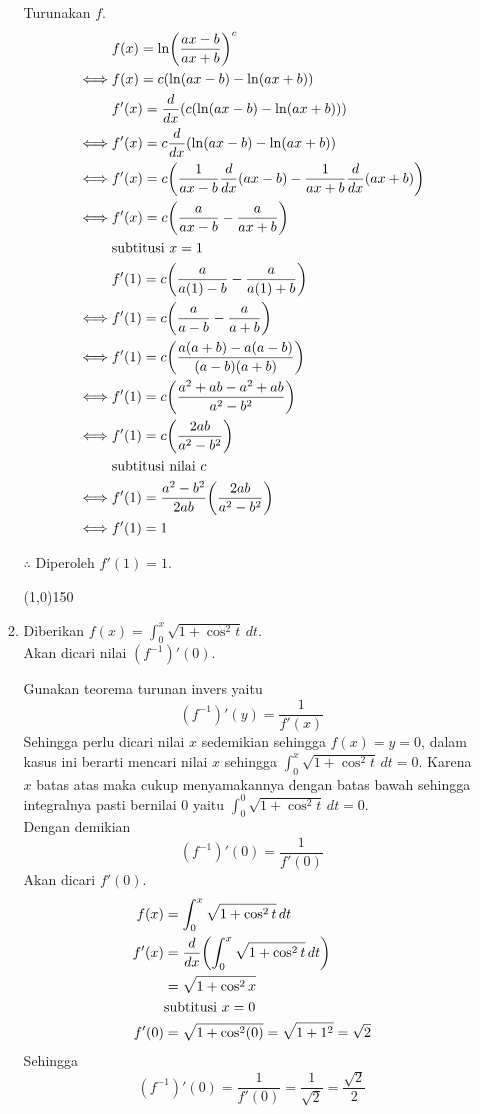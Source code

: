 \begin{enumerate}[leftmargin=*, label={\arabic*}.]
\begin{enumerate}[label={\alph*}.]
    Turunakan $f$.
    \begin{align*}
        &f(x) = \ln\brk*{\frac{ax-b}{ax+b}}^{c}\\
        \iff &f(x) = c\brk*{\ln(ax-b)-\ln(ax+b)}\\
        &f'(x) = \drv{x}{c\brk*{\ln(ax-b)-\ln(ax+b)}}\\
        \iff &f'(x) = c\drv{x}{\ln(ax-b)-\ln(ax+b)}\\
        \iff &f'(x) = c\brk*{\frac{1}{ax-b}\drv{x}{ax-b}
        -\frac{1}{ax+b}\drv{x}{ax+b}}\\
        \iff &f'(x) = c\brk*{\frac{a}{ax-b}
        -\frac{a}{ax+b}}\\
        &\text{subtitusi $x=1$}\\
        &f'(1) = c\brk*{\frac{a}{a(1)-b}-\frac{a}{a(1)+b}}\\
        \iff &f'(1) = c\brk*{\frac{a}{a-b}-\frac{a}{a+b}}\\
        \iff &f'(1) = c\brk*{\frac{a(a+b)-a(a-b)}{(a-b)(a+b)}}\\
        \iff &f'(1) = c\brk*{\frac{a^{2}+ab-a^{2}+ab}{a^{2}-b^{2}}}\\
        \iff &f'(1) = c\brk*{\frac{2ab}{a^{2}-b^{2}}}\\
        &\text{subtitusi nilai $c$}\\
        \iff &f'(1) = \frac{a^{2}-b^{2}}{2ab}\brk*{\frac{2ab}{a^{2}-b^{2}}}\\
        \iff &f'(1) = 1
    \end{align*}

    $\therefore$ Diperoleh $f'(1)=1$.


\begin{center}\line(1,0){150}\end{center}


    \item Diberikan $f(x)=\int_0^{x}\sqrt{1+\cos^{2}t}\,dt$.\\
    Akan dicari nilai $(f^{-1})'(0)$.

    Gunakan teorema turunan invers yaitu
    \[
    (f^{-1})'(y) = \frac{1}{f'(x)}
    \]
    Sehingga perlu dicari nilai $x$ sedemikian sehingga $f(x)=y=0$, dalam kasus 
    ini berarti mencari nilai $x$ sehingga $\int_0^{x}\sqrt{1+\cos^{2}t}\,dt = 0$. 
    Karena $x$ batas atas maka cukup menyamakannya dengan batas bawah sehingga 
    integralnya pasti bernilai $0$ yaitu $\int_0^{0}\sqrt{1+\cos^{2}t}\,dt = 0$.\\
    Dengan demikian
    \[
    (f^{-1})'(0) = \frac{1}{f'(0)}
    \]
    Akan dicari $f'(0)$.
    \begin{align*}
        f(x)&=\int_0^{x}\sqrt{1+\cos^{2}t}\,dt\\
        f'(x)&=\drv{x}{\int_0^{x}\sqrt{1+\cos^{2}t}\,dt}\\
        &=\sqrt{1+\cos^{2}x}\\
        &\text{subtitusi $x=0$}\\
        f'(0) &= \sqrt{1+\cos^{2}(0)} = \sqrt{1+1^{2}} = \sqrt{2}
    \end{align*}
    Sehingga 
    \[
    (f^{-1})'(0) = \frac{1}{f'(0)} = \frac{1}{\sqrt{2}} = \frac{\sqrt{2}}{2}
    \]


\end{enumerate}
\end{enumerate}
